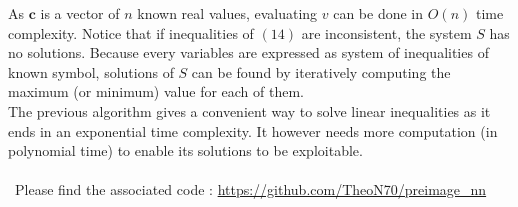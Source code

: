 \documentclass{article}
\begin{document}
\begin{appendices}
            As $\textbf{c}$ is a vector of $n$ known real values, evaluating $v$ can be done in $O(n)$ time complexity.
            Notice that if inequalities of $(14)$ are inconsistent, the system $S$ has no solutions. 
            Because every variables are expressed as system of inequalities of known symbol, solutions of $S$ 
            can be found by iteratively computing the maximum (or minimum) value for each of them.\\
            The previous algorithm gives a convenient way to solve linear inequalities as it ends in an exponential time complexity.
            It however needs more computation (in polynomial time) to enable its solutions to be exploitable.\\
            \\\
            Please find the associated code : \url{https://github.com/TheoN70/preimage_nn}

    \end{appendices}

    
\end{document}
